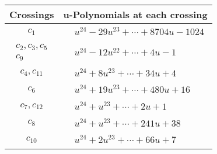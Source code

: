 \documentclass[1p]{elsarticle_modified}
\theoremstyle{definition}
\begin{document}
\begin{tabular}{m{50pt}|m{274pt}}
Crossings & \hspace{64pt}u-Polynomials at each crossing \\
\hline $$\begin{aligned}c_{1}\end{aligned}$$&$\begin{aligned}
&u^{24}-29 u^{23}+\cdots+8704 u-1024
\end{aligned}$\\
\hline $$\begin{aligned}c_{2},c_{3},c_{5}\\c_{9}\end{aligned}$$&$\begin{aligned}
&u^{24}-12 u^{22}+\cdots+4 u-1
\end{aligned}$\\
\hline $$\begin{aligned}c_{4},c_{11}\end{aligned}$$&$\begin{aligned}
&u^{24}+8 u^{23}+\cdots+34 u+4
\end{aligned}$\\
\hline $$\begin{aligned}c_{6}\end{aligned}$$&$\begin{aligned}
&u^{24}+19 u^{23}+\cdots+480 u+16
\end{aligned}$\\
\hline $$\begin{aligned}c_{7},c_{12}\end{aligned}$$&$\begin{aligned}
&u^{24}+u^{23}+\cdots+2 u+1
\end{aligned}$\\
\hline $$\begin{aligned}c_{8}\end{aligned}$$&$\begin{aligned}
&u^{24}+u^{23}+\cdots+241 u+38
\end{aligned}$\\
\hline $$\begin{aligned}c_{10}\end{aligned}$$&$\begin{aligned}
&u^{24}+2 u^{23}+\cdots+66 u+7
\end{aligned}$\\
\hline
\end{tabular}\\~\\
\end{document}
